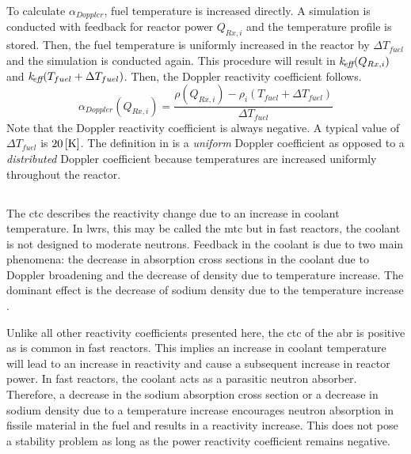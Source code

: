     To calculate $\alpha_{Doppler}$, fuel temperature is increased directly. A
    simulation is conducted with feedback for reactor power $Q_{Rx,i}$ and the
    temperature profile is stored. Then, the fuel temperature is uniformly 
    increased in the reactor by $\Delta T_{fuel}$ and the simulation is
    conducted again. This procedure will result in $k_{\!\mbox{\scriptsize \em eff}}(Q_{Rx,i})$ and
    ${k_{\!\mbox{\scriptsize \em eff}}(T_{fuel} + \Delta T_{fuel})}$. Then, the Doppler reactivity 
    coefficient follows.
    \begin{equation}
      \label{eq:doppler_reactivity_coefficient}
      \alpha_{Doppler}(Q_{Rx,i}) = \frac{\rho(Q_{Rx,i}) - \rho_i(T_{fuel} +
        \Delta T_{fuel})} {\Delta T_{fuel}}
    \end{equation}
    Note that the Doppler reactivity coefficient is always negative. A typical
    value of $\Delta T_{fuel}$ is $20\left[\text{{K}}\right]$. The definition in
     is a \textit{uniform} Doppler
    coefficient as opposed to a \textit{distributed} Doppler coefficient because
    temperatures are increased uniformly throughout the reactor.

  \subsection{\texorpdfstring{}{Coolant Temperature
    Coefficient (CTC)}}
  \label{sec:coolant_temperature_reactivity_coefficient}
    The \gls{ctc} describes the reactivity change due to an increase in coolant
    temperature. In \glspl{lwr}, this may be called the \gls{mtc} but in fast
    reactors, the coolant is not designed to moderate neutrons. Feedback in the
    coolant is due to two main phenomena: the decrease in absorption cross
    sections in the coolant due to Doppler broadening and the decrease of
    density due to temperature increase. The dominant effect is the decrease of
    sodium density due to the temperature increase \cite{textbookknief}.

    Unlike all other reactivity coefficients presented here, the \gls{ctc} of
    the \gls{abr} is positive as is common in fast reactors. This implies an
    increase in coolant temperature will lead to an increase in reactivity and
    cause a subsequent increase in reactor power. In fast reactors, the coolant
    acts as a parasitic neutron absorber. Therefore, a decrease in the sodium
    absorption cross section or a decrease in sodium density due to a
    temperature increase encourages neutron absorption in fissile material in
    the fuel and results in a reactivity increase. This does not pose a 
    stability problem as long as the power reactivity coefficient remains 
    negative.

